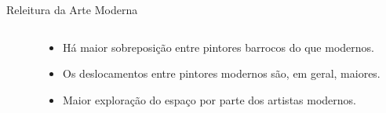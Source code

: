 \documentclass{beamer}
\begin{document}
\begin{frame}{Releitura da Arte Moderna}

\begin{columns}
 \begin{column}{.49\textwidth}
 \end{column}

 \begin{column}{.49\textwidth}
  \begin{itemize}
    \item<1> Há maior sobreposição entre pintores barrocos do que modernos.

    \item<2> Os deslocamentos entre pintores modernos são, em geral, maiores.

    \item<2> Maior exploração do espaço por parte dos artistas modernos.
  \end{itemize}
 \end{column}
\end{columns}

\end{frame}
\end{document}

